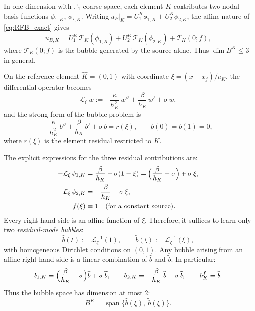 \documentclass[11pt]{article}
\newcommand{\calL}{\mathcal{L}}
\newcommand{\calT}{\mathcal{T}}
\theoremstyle{remark}
\begin{document}
In one dimension with $\mathbb{P}_1$ coarse space, each element $K$ contributes two nodal basis functions $\phi_{1,K}$, $\phi_{2,K}$. Writing $u_P\big|_K = U_1^K \phi_{1,K} + U_2^K \phi_{2,K}$, the affine nature of \eqref{eq:RFB_exact} gives
\begin{equation}
u_{B,K} = U_1^K\,\calT_K(\phi_{1,K}) + U_2^K\,\calT_K(\phi_{2,K}) + \calT_K(0; f),
\end{equation}
where $\calT_K(0;f)$ is the bubble generated by the source alone. Thus $\dim B^K \leq 3$ in general.

On the reference element $\widehat{K} = (0,1)$ with coordinate $\xi = (x - x_j)/h_K$, the differential operator becomes
\begin{equation}\label{eq:L_ref}
\calL_\xi\, w := -\frac{\kappa}{h_K^2}\,w'' + \frac{\beta}{h_K}\,w' + \sigma\,w,
\end{equation}
and the strong form of the bubble problem is
\begin{equation}\label{eq:local_strong}
-\frac{\kappa}{h_K^2}\,b'' + \frac{\beta}{h_K}\,b' + \sigma\,b = r(\xi), \qquad b(0) = b(1) = 0,
\end{equation}
where $r(\xi)$ is the element residual restricted to $K$.

The explicit expressions for the three residual contributions are:
\begin{align}
-\calL_\xi\,\phi_{1,K} &= \frac{\beta}{h_K} - \sigma(1-\xi) = \Bigl(\frac{\beta}{h_K} - \sigma\Bigr) + \sigma\,\xi,\\
-\calL_\xi\,\phi_{2,K} &= -\frac{\beta}{h_K} - \sigma\,\xi,\\
f(\xi) &\equiv 1 \quad \text{(for a constant source)}.
\end{align}
Every right-hand side is an affine function of $\xi$. Therefore, it suffices to learn only two \emph{residual-mode bubbles}:
\begin{equation}\label{eq:residual_modes}
\widehat{b}(\xi) := \calL_\xi^{-1}(1), \qquad \widetilde{b}(\xi) := \calL_\xi^{-1}(\xi),
\end{equation}
with homogeneous Dirichlet conditions on $(0,1)$. Any bubble arising from an affine right-hand side is a linear combination of $\widehat{b}$ and $\widetilde{b}$. In particular:
\begin{equation}\label{eq:bk_components}
b_{1,K} = \Bigl(\frac{\beta}{h_K} - \sigma\Bigr)\widehat{b} + \sigma\,\widetilde{b}, \qquad
b_{2,K} = -\frac{\beta}{h_K}\,\widehat{b} - \sigma\,\widetilde{b}, \qquad
b_K^f = \widehat{b}.
\end{equation}
Thus the bubble space has dimension at most 2:
\begin{equation}
B^K = \operatorname{span}\{\widehat{b}(\xi),\;\widetilde{b}(\xi)\}.
\end{equation}
\end{document}
